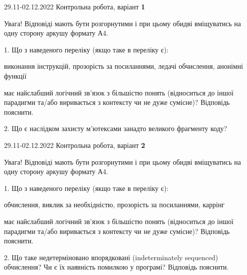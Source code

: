 \documentclass[11pt, ukrainian]{article}
\begin{document}
{29.11-02.12.2022 Контрольна робота, варіант  \No \textbf { 1 }\par}
Увага! Відповіді мають бути розгорнутими і при цьому обидві вміщуватись на одну сторону аркушу формату А4.

{
\begin {large}

1. Що з наведеного переліку (якщо таке в переліку є):

\vspace{4mm}
 виконання інструкцій, прозорість за посиланнями, ледачі обчислення, анонімні функції

\vspace{4mm}
має найслабший логічний зв’язок з більшістю понять (відноситься до іншої парадигми та/або виривається з контексту чи не дуже сумісне)? Відповідь пояснити.


2. Що є наслідком захисту м’ютексами занадто великого фрагменту коду?

\end {large}}

\vspace{4mm}



{29.11-02.12.2022 Контрольна робота, варіант  \No \textbf { 2 }\par}
Увага! Відповіді мають бути розгорнутими і при цьому обидві вміщуватись на одну сторону аркушу формату А4.

{
\begin {large}

1. Що з наведеного переліку (якщо таке в переліку є):

\vspace{4mm}
 обчислення, виклик за необхідністю, прозорість за посиланнями, каррінг

\vspace{4mm}
має найслабший логічний зв’язок з більшістю понять (відноситься до іншої парадигми та/або виривається з контексту чи не дуже сумісне)? Відповідь пояснити.


2. Що таке недетерміновано впорядковані (indeterminately sequenced) обчислення? Чи є їх наявність помилкою у програмі?  Відповідь пояснити.

\end {large}}

\vspace{4mm}
\end{document}
